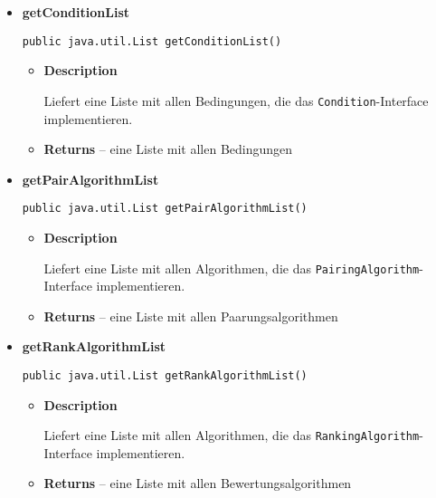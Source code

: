 {{{{{{{{{\begin{itemize}
{\begin{itemize}
{Liefert eine Liste mit allen Strategien, die das \texttt{\small BaseStrategy}-Interface implementieren.
}
\item{{\bf  Returns} -- 
eine Liste mit allen Basis-Strategien 
}%
\end{itemize}
}%
\item{ 
\hypertarget{de.sswis.controller.ModelServiceLoader.getConditionList()}{{\bf  getConditionList}\\}
\begin{lstlisting}[frame=none]
public java.util.List getConditionList()\end{lstlisting} %
\begin{itemize}
\item{
{\bf  Description}

Liefert eine Liste mit allen Bedingungen, die das \texttt{\small Condition}-Interface implementieren.
}
\item{{\bf  Returns} -- 
eine Liste mit allen Bedingungen 
}%
\end{itemize}
}%
\item{ 
\hypertarget{de.sswis.controller.ModelServiceLoader.getPairAlgorithmList()}{{\bf  getPairAlgorithmList}\\}
\begin{lstlisting}[frame=none]
public java.util.List getPairAlgorithmList()\end{lstlisting} %
\begin{itemize}
\item{
{\bf  Description}

Liefert eine Liste mit allen Algorithmen, die das \texttt{\small PairingAlgorithm}-Interface implementieren.
}
\item{{\bf  Returns} -- 
eine Liste mit allen Paarungsalgorithmen 
}%
\end{itemize}
}%
\item{ 
\hypertarget{de.sswis.controller.ModelServiceLoader.getRankAlgorithmList()}{{\bf  getRankAlgorithmList}\\}
\begin{lstlisting}[frame=none]
public java.util.List getRankAlgorithmList()\end{lstlisting} %
\begin{itemize}
\item{
{\bf  Description}

Liefert eine Liste mit allen Algorithmen, die das \texttt{\small RankingAlgorithm}-Interface implementieren.
}
\item{{\bf  Returns} -- 
eine Liste mit allen Bewertungsalgorithmen 
}%
\end{itemize}
}%
\end{itemize}
}
}
}}}}}}}
